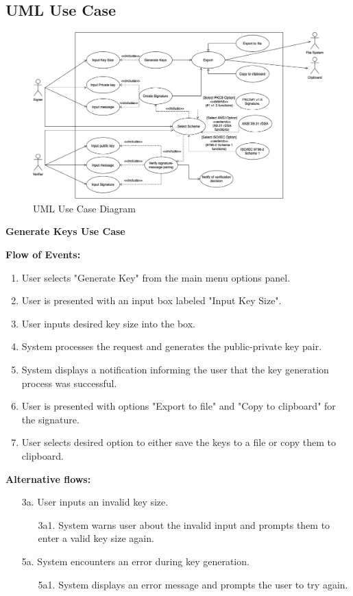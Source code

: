 \documentclass[]{final_report}
\theoremstyle{definition}
\begin{document}
\subsection{UML Use Case}
\begin{figure}[H]
    \centering
    \includegraphics[scale=0.48]{poc_pictures/POC_USE-CASE.png}
    \caption{UML Use Case Diagram}
    \label{fig:uc}
\end{figure}



\textbf{Generate Keys Use Case}

\noindent\textbf{Flow of Events:}
\begin{enumerate}
    \item User selects "Generate Key" from the main menu options panel.
    \item User is presented with an input box labeled "Input Key Size".
    \item User inputs desired key size into the box.
    \item System processes the request and generates the public-private key pair.
    \item System displays a notification informing the user that the key generation process was successful.
    \item User is presented with options "Export to file" and "Copy to clipboard" for the signature.
    \item User selects desired option to either save the keys to a file or copy them to clipboard.
\end{enumerate}

\noindent\textbf{Alternative flows:}
\begin{enumerate}
    \item[3a.] User inputs an invalid key size.
    \begin{enumerate}
        \item[3a1.] System warns user about the invalid input and prompts them to enter a valid key size again.
    \end{enumerate}
    \item[5a.] System encounters an error during key generation.
    \begin{enumerate}
        \item[5a1.] System displays an error message and prompts the user to try again.
    \end{enumerate}
     
\end{enumerate}
\end{document}
